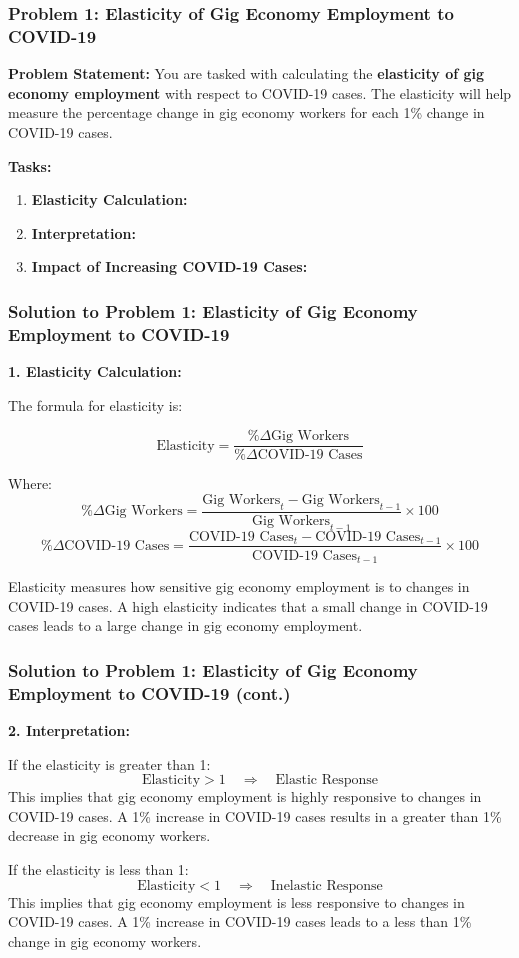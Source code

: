 \documentclass{beamer}
\begin{document}
\begin{frame}
\frametitle{Problem 1: Elasticity of Gig Economy Employment to COVID-19}
\textbf{Problem Statement:}
You are tasked with calculating the \textbf{elasticity of gig economy employment} with respect to COVID-19 cases. The elasticity will help measure the percentage change in gig economy workers for each 1\% change in COVID-19 cases.

\textbf{Tasks:}
\begin{enumerate}
    \item \textbf{Elasticity Calculation:}
    \item \textbf{Interpretation:}
    \item \textbf{Impact of Increasing COVID-19 Cases:}
\end{enumerate}
\end{frame}

\begin{frame}
\frametitle{Solution to Problem 1: Elasticity of Gig Economy Employment to COVID-19}
\textbf{1. Elasticity Calculation:}

The formula for elasticity is:

\[
\text{Elasticity} = \frac{\% \Delta \text{Gig Workers}}{\% \Delta \text{COVID-19 Cases}}
\]

Where:
\[
\% \Delta \text{Gig Workers} = \frac{\text{Gig Workers}_t - \text{Gig Workers}_{t-1}}{\text{Gig Workers}_{t-1}} \times 100
\]
\[
\% \Delta \text{COVID-19 Cases} = \frac{\text{COVID-19 Cases}_t - \text{COVID-19 Cases}_{t-1}}{\text{COVID-19 Cases}_{t-1}} \times 100
\]

Elasticity measures how sensitive gig economy employment is to changes in COVID-19 cases. A high elasticity indicates that a small change in COVID-19 cases leads to a large change in gig economy employment.

\end{frame}

\begin{frame}
\frametitle{Solution to Problem 1: Elasticity of Gig Economy Employment to COVID-19 (cont.)}
\textbf{2. Interpretation:}

If the elasticity is greater than 1:
\[
\text{Elasticity} > 1 \quad \Rightarrow \quad \text{Elastic Response}
\]
This implies that gig economy employment is highly responsive to changes in COVID-19 cases. A 1\% increase in COVID-19 cases results in a greater than 1\% decrease in gig economy workers.

If the elasticity is less than 1:
\[
\text{Elasticity} < 1 \quad \Rightarrow \quad \text{Inelastic Response}
\]
This implies that gig economy employment is less responsive to changes in COVID-19 cases. A 1\% increase in COVID-19 cases leads to a less than 1\% change in gig economy workers.

\end{frame}
\end{document}
